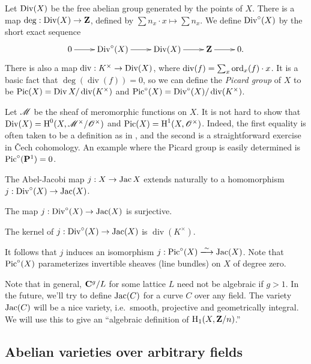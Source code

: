 Let $\operatorname{Div}(X)$ be the free abelian group generated by the points of $X$. There 
is a map $\deg:\operatorname{Div}(X)\to \mathbf{Z}$, defined by 
$\sum n_x\cdot x\mapsto \sum n_x$. We define $\operatorname{Div}^\circ(X)$ by the short exact 
sequence 
\[\xymatrix{
  0 \ar[r]
    & \divisor^\circ(X) \ar[r]
    & \divisor(X) \ar[r]
    & \dZ \ar[r]
    & 0 \text{.}
}\]
There is also a map $\operatorname{div}:K^\times\to \operatorname{Div}(X)$, where 
$\operatorname{div}(f) = \sum_x \operatorname{ord}_x(f)\cdot x$. It is a basic fact that 
$\deg(\operatorname{div}(f)) = 0$, so we can define the \emph{Picard group} 
of $X$ to be $\operatorname{Pic}(X) = \operatorname{Div} X/\operatorname{div}(K^\times)$ and 
$\operatorname{Pic}^\circ(X) = \operatorname{Div}^\circ (X)/\operatorname{div}(K^\times)$. 

Let $\mathscr{M}$ be the sheaf of meromorphic functions on $X$. It is not hard to show 
that $\operatorname{Div}(X)=\operatorname{H}^0(X,\mathscr{M}^\times/\mathscr{O}^\times)$ and 
$\operatorname{Pic}(X)=\operatorname{H}^1(X,\mathscr{O}^\times)$. Indeed, the first equality is often taken to 
be a definition as in \cite[III.6]{ha77}, and the second is a straightforward 
exercise in \v Cech cohomology. An example where the Picard group is easily 
determined is $\operatorname{Pic}^\circ(\mathbf{P}^1) = 0$.

The Abel-Jacobi map $j:X\to \operatorname{Jac} X$ extends naturally to a homomorphism  
$j:\operatorname{Div}^\circ(X)\to \operatorname{Jac}(X)$. 

\begin{theorem}[Jacobi]
The map $j:\operatorname{Div}^\circ(X)\to\operatorname{Jac}(X)$ is surjective.
\end{theorem}

\begin{theorem}[Abel]
The kernel of $j:\operatorname{Div}^\circ(X)\to \operatorname{Jac}(X)$ is $\operatorname{div}(K^\times)$. 
\end{theorem}

It follows that $j$ induces an isomorphism $j:\picard^\circ(X)\isomorphism \jac(X)$. 
Note that $\operatorname{Pic}^\circ(X)$ parameterizes invertible sheaves (line bundles) on 
$X$ of degree zero. 

Note that in general, $\mathbf{C}^g/L$ for some lattice $L$ need not be 
algebraic if $g>1$. In the future, we'll try to define $\operatorname{Jac}(C)$ for a curve 
$C$ over any field. The variety $\operatorname{Jac}(C)$ will be a nice variety, i.e.~smooth, 
projective and geometrically integral. We will use this to give an 
``algebraic definition of $\operatorname{H}_1(X,\mathbf{Z}/n)$.'' 





\subsection{Abelian varieties over arbitrary fields}

